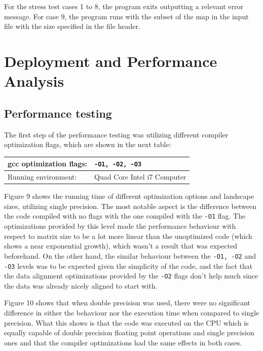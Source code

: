 \documentclass[12pt,a4paper]{article}
\begin{document}
For the stress test cases 1 to 8, the program exits outputting a relevant error message. For case 9, the program runs with the subset of the map in the input file with the size specified in the file header.

\section{Deployment and Performance Analysis}

\subsection{Performance testing} 


The first step of the performance testing was utilizing different compiler optimization flags, which are shown in the next table:

\begin{tabular}{ | l || l | }
    \hline
    gcc optimization flags:  & \texttt{-O1, -O2, -O3} \\
    \hline
    Running environment:  & Quad Core Intel i7 Computer \\
    \hline
\end{tabular}

Figure 9 shows the running time of different optimization options and landscape sizes, utilizing single precision. The most notable aspect is the difference between the code compiled with no flags with the one compiled with the \texttt{-O1} flag. The optimizations provided by this level made the performance behaviour with respect to matrix size to be a lot more linear than the unoptimized code (which shows a near exponential growth), which wasn't a result that was expected beforehand. On the other hand, the similar behaviour between the  \texttt{-O1, -O2} and  \texttt{-O3} levels was to be expected given the simplicity of the code, and the fact that the data alignment optimizations provided by the \texttt{-O2} flags don't help much since the data was already nicely aligned to start with.

Figure 10 shows that when double precision was used, there were no significant difference in either the behaviour nor the execution time when compared to single precision. What this shows is that the code was executed on the CPU which is equally capable of double precision floating point operations and single precision ones and that the compiler optimizations had the same effects in both cases.
\end{document}
